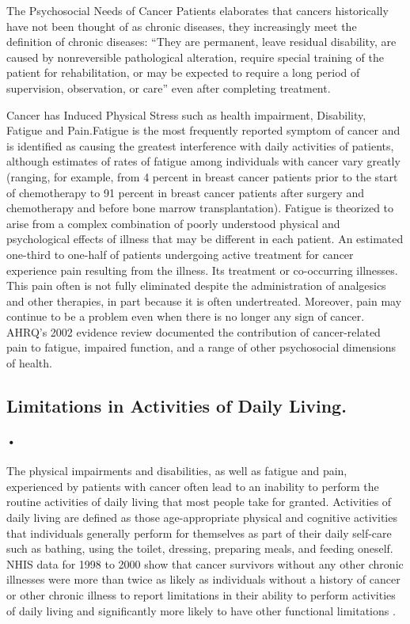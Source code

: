\documentclass[12pt]{article}
\begin{document}
The Psychosocial Needs of Cancer Patients elaborates that cancers historically have not been thought of as chronic diseases, they increasingly meet the definition of chronic diseases: “They are permanent, leave residual disability, are caused by nonreversible pathological alteration, require special training of the patient for rehabilitation, or may be expected to require a long period of supervision, observation, or care”\cite{Timmreck} even after completing treatment.

Cancer has Induced Physical Stress such as health impairment, Disability, Fatigue and Pain.Fatigue is the most frequently reported symptom of cancer and is identified as causing the greatest interference with daily activities of patients, although estimates of rates of fatigue among individuals with cancer vary greatly (ranging, for example, from 4 percent in breast cancer patients prior to the start of chemotherapy to 91 percent in breast cancer patients after surgery and chemotherapy and before bone marrow transplantation). Fatigue is theorized to arise from a complex combination of poorly understood physical and psychological effects of illness that may be different in each patient\cite{Carr}. An estimated one-third to one-half of patients undergoing active treatment for cancer experience pain resulting from the illness. Its treatment or co-occurring illnesses. This pain often is not fully eliminated despite the administration of analgesics and other therapies, in part because it is often undertreated. Moreover, pain may continue to be a problem even when there is no longer any sign of cancer. AHRQ’s 2002 evidence review documented the contribution of cancer-related pain to fatigue, impaired function, and a range of other psychosocial dimensions of health\cite{Carr}.

\subsection{Limitations in Activities of Daily Living.}

\paragraph{•}The physical impairments and disabilities, as well as fatigue and pain, experienced by patients with cancer often lead to an inability to perform the routine activities of daily living that most people take for granted. Activities of daily living are defined as those age-appropriate physical and cognitive activities that individuals generally perform for themselves as part of their daily self-care such as bathing, using the toilet, dressing, preparing meals, and feeding oneself. NHIS data for 1998 to 2000 show that cancer survivors without any other chronic illnesses were more than twice as likely as individuals without a history of cancer or other chronic illness to report limitations in their ability to perform activities of daily living and significantly more likely to have other functional limitations \cite{Hewitt}. 
\end{document}
